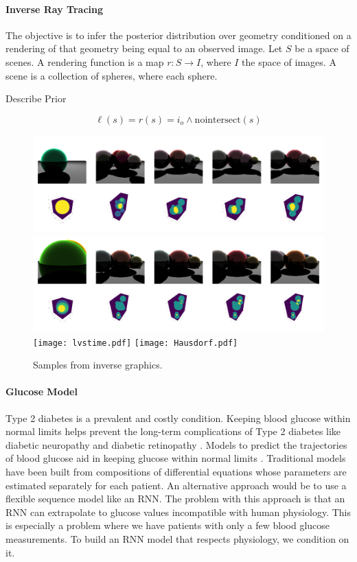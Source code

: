 \paragraph{Inverse Ray Tracing}
The objective is to infer the posterior distribution over geometry conditioned on a rendering of that geometry being equal to an observed image.
Let $S$ be a space of scenes.
A rendering function is a map $r: S \to I$, where $I$ the space of images.
A scene is a collection of spheres, where each sphere.


Describe Prior

$$
\ell(s) = r(s) = i_o \land \textrm{nointersect}(s)
$$


\begin{figure}
	\centering
	\includegraphics[width=0.9\linewidth]{invg2.pdf}
	\includegraphics[width=0.9\linewidth]{invgb.pdf}
	\texttt{[image: lvstime.pdf]}
	\texttt{[image: Hausdorf.pdf]}
	\caption{ Samples from inverse graphics.}
	\label{fig:invrtmcmc}
\end{figure}


\paragraph{Glucose Model}
Type 2 diabetes is a prevalent and costly condition.
Keeping blood glucose within normal limits helps prevent the
long-term complications of Type 2 diabetes like diabetic neuropathy and diabetic retinopathy \citep{brownlee2006glycemic}. Models to predict the trajectories of blood glucose aid in keeping glucose within
normal limits \citep{zeevi2015personalized}. Traditional models have been built from compositions of differential equations \citep{albers2017personalized,levine2017offline} whose parameters are estimated separately for each patient. An alternative approach would be to use a flexible sequence model like an RNN. The problem with this approach is that an RNN can extrapolate to glucose values incompatible with human physiology. This is especially a problem where we have patients with only a few blood glucose measurements. To build an RNN model that respects physiology, we condition on it.


